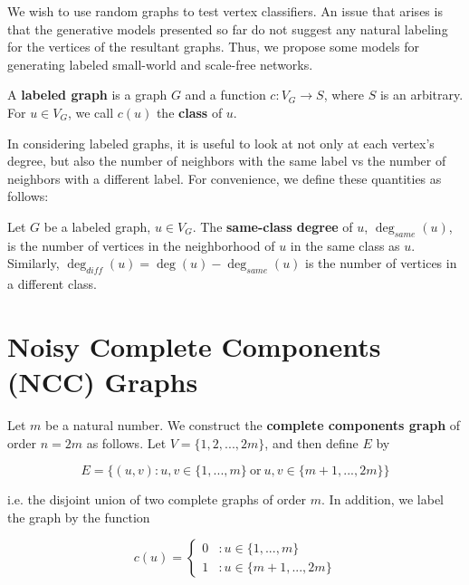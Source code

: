 We wish to use random graphs to test vertex classifiers. An issue that arises is that the generative
models presented so far do not suggest any natural labeling for the vertices of the resultant graphs.
Thus, we propose some models for generating labeled small-world and scale-free networks.

\begin{definition}
  A \textbf{labeled graph} is a graph $G$ and a function $c : V_G \to S$, where $S$ is an arbitrary.
  For $u \in V_G$, we call $c(u)$ the \textbf{class} of $u$.
\end{definition}

In considering labeled graphs, it is useful to look at not only at each vertex's degree, but also the
number of neighbors with the same label vs the number of neighbors with a different label. For
convenience, we define these quantities as follows:

\begin{definition}
  Let $G$ be a labeled graph, $u \in V_G$. The \textbf{same-class degree} of $u$, $\deg_{\textit{same}}(u)$, is
  the number of vertices in the neighborhood of $u$ in the same class as $u$. Similarly, $\deg_{\textit{diff}}(u) =
  \deg(u) - \deg_{\textit{same}}(u)$ is the number of vertices in a different class.
\end{definition}


\section{Noisy Complete Components (NCC) Graphs}

\begin{definition}
  Let $m$ be a natural number. We construct the \textbf{complete components
    graph} of order $n = 2m$ as follows. Let $V = \{1,2, ..., 2m\}$, and then define
  $E$ by

  \[
    E = \{ (u,v) : u,v \in \{1,...,m\} ~\text{or}~ u,v \in \{m+1,...,2m\} \}
  \]

  i.e. the disjoint union of two complete graphs of order $m$. In addition, we label the graph by the
  function

  \[c(u) =
      \begin{cases}
        0 &: u \in \{1,...,m\} \\
        1 &: u \in \{m+1,...,2m\}
      \end{cases}
    \]
\end{definition}

